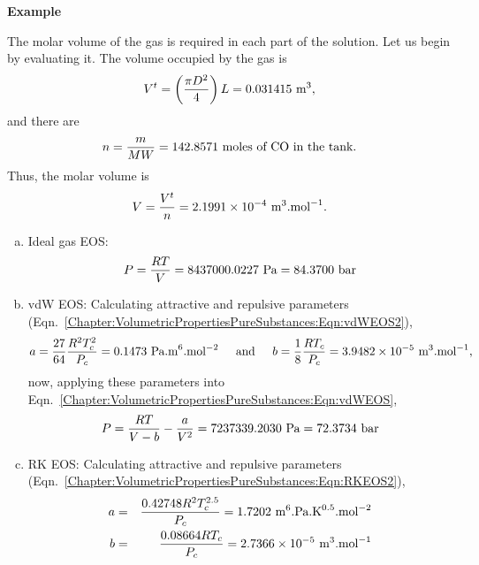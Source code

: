 \begin{MyExample}{\begin{center}{\bf Example}\end{center}}
       The molar volume of the gas is required in each part of the solution. Let us begin by evaluating it. The volume occupied by the gas is
       \begin{displaymath}
         V^{t} = \left(\displaystyle\frac{\pi D^{2}}{4}\right)L = 0.031415\text{ m}^{3},
       \end{displaymath}
       and there are  
       \begin{displaymath}
         n = \displaystyle\frac{m}{MW} = 142.8571 \text{ moles of CO in the tank.} 
       \end{displaymath}
       Thus, the molar volume is
       \begin{displaymath}
         V = \displaystyle\frac{V^{t}}{n} = 2.1991\times 10^{-4}\text{ m}^{3}\text{.mol}^{-1}.         
       \end{displaymath}
%       
       \begin{enumerate}[a)]
       \item Ideal gas EOS:
         \begin{displaymath}
           P = \displaystyle\frac{RT}{V} = 8437000.0227\text{ Pa} = 84.3700\text{ bar}
         \end{displaymath}
%
       \item vdW EOS: Calculating attractive and repulsive parameters (Eqn.~\ref{Chapter:VolumetricPropertiesPureSubstances:Eqn:vdWEOS2}),
         \begin{displaymath}
           a = \displaystyle\frac{27}{64}\displaystyle\frac{R^{2}T_{c}^{2}}{P_{c}} = 0.1473 \text{ Pa.m}^{6}\text{.mol}^{-2}\;\;\;\;\text{ and }\;\;\;\; b = \displaystyle\frac{1}{8}\displaystyle\frac{R T_{c}}{P_{c}} = 3.9482\times 10^{-5}\text{ m}^{3}\text{.mol}^{-1},
         \end{displaymath}
         now, applying these parameters into Eqn.~\ref{Chapter:VolumetricPropertiesPureSubstances:Eqn:vdWEOS},
         \begin{displaymath}
           P = \displaystyle\frac{R T}{V-b} - \displaystyle\frac{a}{V^{2}} = 7237339.2030\text{ Pa} = 72.3734\text{ bar}
         \end{displaymath}
%
       \item RK EOS: Calculating attractive and repulsive parameters (Eqn.~\ref{Chapter:VolumetricPropertiesPureSubstances:Eqn:RKEOS2}),
         \begin{eqnarray}
           a &=& \frc{0.42748 R^{2}T_{c}^{2.5}}{P_{c}}= 1.7202\text{ m}^{6}\text{.Pa.K}^{0.5}\text{.mol}^{-2} \nonumber \\
           b &=& \frc{0.08664 R T_{c} }{P_{c}} = 2.7366\times 10^{-5}\text{ m}^{3}\text{.mol}^{-1} \nonumber 

\end{eqnarray}
\end{enumerate}
\end{MyExample}
